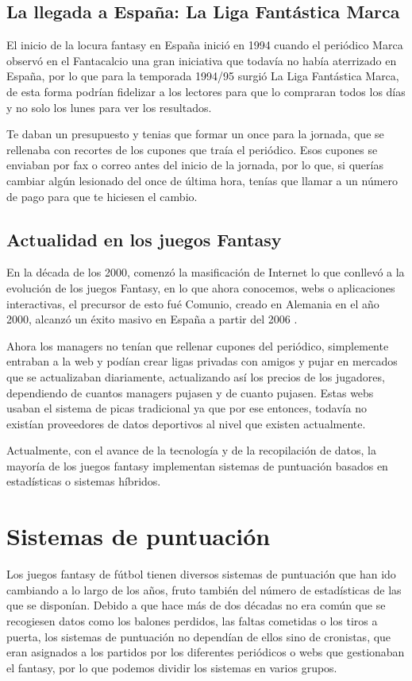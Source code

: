     \subsection{La llegada a España: La Liga Fantástica Marca} El inicio de la locura fantasy en España inició en 1994 cuando el periódico Marca observó en el Fantacalcio una gran iniciativa que todavía no había aterrizado en España, por lo que para la temporada 1994/95 surgió La Liga Fantástica Marca, de esta forma podrían fidelizar a los lectores para que lo compraran todos los días y no solo los lunes para ver los resultados.

    Te daban un presupuesto y tenias que formar un once para la jornada, que se rellenaba con recortes de los cupones que traía el periódico. Esos cupones se enviaban por fax o correo antes del inicio de la jornada, por lo que, si querías cambiar algún lesionado del once de última hora, tenías que llamar a un número de pago para que te hiciesen el cambio.

    \subsection{Actualidad en los juegos Fantasy} En la década de los 2000, comenzó la masificación de Internet lo que conllevó a la evolución de los juegos Fantasy, en lo que ahora conocemos, webs o aplicaciones interactivas, el precursor de esto fué Comunio, creado en Alemania en el año 2000, alcanzó un éxito masivo en España a partir del 2006 \cite{comunio_origen}.

    Ahora los managers no tenían que rellenar cupones del periódico, simplemente entraban a la web y podían crear ligas privadas con amigos y pujar en mercados que se actualizaban diariamente, actualizando así los precios de los jugadores, dependiendo de cuantos managers pujasen y de cuanto pujasen. Estas webs usaban el sistema de picas tradicional ya que por ese entonces, todavía no existían proveedores de datos deportivos al nivel que existen actualmente.

    Actualmente, con el avance de la tecnología y de la recopilación de datos, la mayoría de los juegos fantasy implementan sistemas de puntuación basados en estadísticas o sistemas híbridos.

\section{Sistemas de puntuación}
Los juegos fantasy de fútbol tienen diversos sistemas de puntuación que han ido cambiando a lo largo de los años, fruto también del número de estadísticas de las que se disponían. Debido a que hace más de dos décadas no era común que se recogiesen datos como los balones perdidos, las faltas cometidas o los tiros a puerta, los sistemas de puntuación no dependían de ellos sino de cronistas, que eran asignados a los partidos por los diferentes periódicos o webs que gestionaban el fantasy, por lo que podemos dividir los sistemas en varios grupos.

